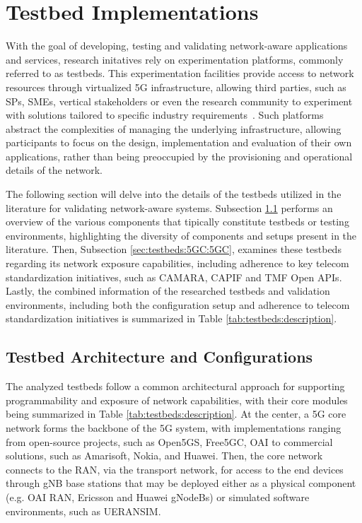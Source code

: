 \section{Testbed Implementations} \label{sec:testbeds:main}


With the goal of developing, testing and validating network-aware applications and services, research initatives rely on experimentation platforms, commonly referred to as testbeds. This experimentation facilities provide access to network resources through virtualized \acs{5G} infrastructure, allowing third parties, such as \acsp{SP}, \acsp{SME}, vertical stakeholders or even the research community to experiment with solutions tailored to specific industry requirements~\cite{ICT-41-2020}. Such platforms abstract the complexities of managing the underlying infrastructure, allowing participants to focus on the design, implementation and evaluation of their own applications, rather than being preoccupied by the provisioning and operational details of the network.

The following section will delve into the details of the testbeds utilized in the literature for validating network-aware systems. Subsection \ref{sec:testbeds:5GC} performs an overview of the various components that tipically constitute testbeds or testing environments, highlighting the diversity of components and setups present in the literature. Then, Subsection \ref{sec:testbeds:5GC:5GC}, examines these testbeds regarding its network exposure capabilities, including adherence to key telecom standardization initiatives, such as CAMARA, \acs{CAPIF} and \acs{TMF} Open \acsp{API}. Lastly, the combined information of the researched testbeds and validation environments, including both the configuration setup and adherence to telecom standardization initiatives is summarized in Table \ref{tab:testbeds:description}.


\subsection{Testbed Architecture and Configurations} \label{sec:testbeds:5GC}

The analyzed testbeds follow a common architectural approach for supporting programmability and exposure of network capabilities, with their core modules being summarized in Table \ref{tab:testbeds:description}. At the center, a \acs{5G} core network forms the backbone of the \acs{5G} system, with implementations ranging from open-source projects, such as Open5GS, Free5GC, \acs{OAI} to commercial solutions, such as Amarisoft, Nokia, and Huawei. Then, the core network connects to the \acs{RAN}, via the transport network, for access to the end devices through \acs{gNB} base stations that may be deployed either as a physical component (e.g. \acs{OAI} \acs{RAN}, Ericsson and Huawei gNodeBs) or simulated software environments, such as UERANSIM.

